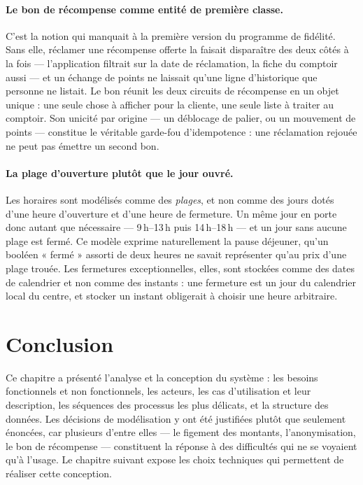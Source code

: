 \paragraph{Le bon de récompense comme entité de première classe.} C'est la
notion qui manquait à la première version du programme de fidélité. Sans elle,
réclamer une récompense offerte la faisait disparaître des deux côtés à la fois
--- l'application filtrait sur la date de réclamation, la fiche du comptoir
aussi --- et un échange de points ne laissait qu'une ligne d'historique que
personne ne listait. Le bon réunit les deux circuits de récompense en un objet
unique : une seule chose à afficher pour la cliente, une seule liste à traiter
au comptoir. Son unicité par origine --- un déblocage de palier, ou un
mouvement de points --- constitue le véritable garde-fou d'idempotence : une
réclamation rejouée ne peut pas émettre un second bon.

\paragraph{La plage d'ouverture plutôt que le jour ouvré.} Les horaires sont
modélisés comme des \emph{plages}, et non comme des jours dotés d'une heure
d'ouverture et d'une heure de fermeture. Un même jour en porte donc autant que
nécessaire --- 9\,h--13\,h puis 14\,h--18\,h --- et un jour sans aucune plage
est fermé. Ce modèle exprime naturellement la pause déjeuner, qu'un booléen
« fermé » assorti de deux heures ne savait représenter qu'au prix d'une plage
trouée. Les fermetures exceptionnelles, elles, sont stockées comme des dates de
calendrier et non comme des instants : une fermeture est un jour du calendrier
local du centre, et stocker un instant obligerait à choisir une heure
arbitraire.

\section*{Conclusion}

Ce chapitre a présenté l'analyse et la conception du système : les besoins
fonctionnels et non fonctionnels, les acteurs, les cas d'utilisation et leur
description, les séquences des processus les plus délicats, et la structure des
données. Les décisions de modélisation y ont été justifiées plutôt que
seulement énoncées, car plusieurs d'entre elles --- le figement des montants,
l'anonymisation, le bon de récompense --- constituent la réponse à des
difficultés qui ne se voyaient qu'à l'usage. Le chapitre suivant expose les
choix techniques qui permettent de réaliser cette conception.

